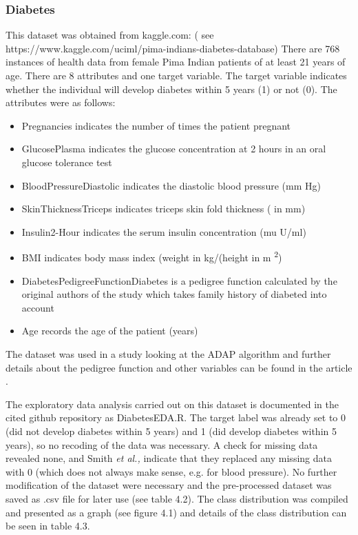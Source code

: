 \subsubsection{Diabetes}
This dataset was obtained from kaggle.com:\newline
( see https://www.kaggle.com/uciml/pima-indians-diabetes-database)\newline
There are 768 instances of health data from female Pima Indian patients of at least 21 years of age. There are 8 attributes and one target variable. The target variable indicates whether the individual will develop diabetes within 5 years (1) or not (0). The attributes were as follows:
\begin{itemize}
    \item Pregnancies indicates the number of times the patient pregnant
    \item GlucosePlasma indicates the glucose concentration at 2 hours in an oral glucose tolerance test
    \item BloodPressureDiastolic indicates the diastolic blood pressure (mm Hg)
    \item SkinThicknessTriceps indicates triceps skin fold thickness ( in mm)
    \item Insulin2-Hour indicates the serum insulin concentration  (mu U/ml)
    \item BMI indicates body mass index (weight in kg/(height in m \textsuperscript{2})
    \item DiabetesPedigreeFunctionDiabetes is a pedigree function calculated by the original authors of the study which takes family history of diabeted into account
    \item Age records the age of the patient (years)
\end{itemize}
 The dataset was used in a study looking at the ADAP algorithm and further details about the pedigree function and other variables can be found in the article \citep{Smith:1988wy}.
 
The exploratory data analysis carried out on this dataset is documented in the cited github repository as DiabetesEDA.R.\newline
The target label was already set to 0 (did not develop diabetes within 5 years) and 1 (did develop diabetes within 5 years), so no recoding of the data was necessary.\newline
A check for missing data revealed none, and Smith \textit{et al.,} indicate that they replaced any missing data with 0 (which does not always make sense, e.g. for blood pressure). No further modification of the dataset were necessary and the pre-processed dataset was saved as .csv file for later use (see table 4.2).
The class distribution was compiled and presented as a graph (see figure 4.1) and details of the class distribution can be seen in table 4.3. 


